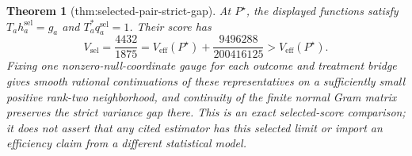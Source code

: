 \documentclass{article}
\newtheorem{theorem}{Theorem}
\begin{document}
\begin{theorem}[thm:selected-pair-strict-gap]\label{thm:selected-pair-strict-gap}
At \(P^\star\), the displayed functions satisfy \(T_ah_a^{\mathrm{sel}}=g_a\) and \(T_a^*q_a^{\mathrm{sel}}=1\). Their score has
\[
V_{\mathrm{sel}}=\frac{4432}{1875}
=V_{\mathrm{eff}}(P^\star)+\frac{9496288}{200416125}
>V_{\mathrm{eff}}(P^\star).
\]
Fixing one nonzero-null-coordinate gauge for each outcome and treatment bridge gives smooth rational continuations of these representatives on a sufficiently small positive rank-two neighborhood, and continuity of the finite normal Gram matrix preserves the strict variance gap there. This is an exact selected-score comparison; it does not assert that any cited estimator has this selected limit or import an efficiency claim from a different statistical model.
\end{theorem}
\end{document}
